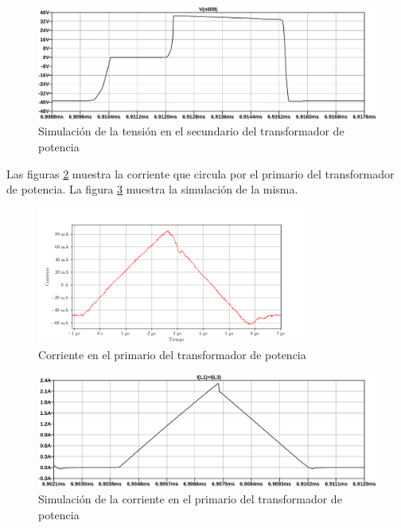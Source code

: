 \begin{figure}[H]
    \centering
    \includegraphics[width=\textwidth]{images/sim/20.pdf}
    \caption{Simulación de la tensión en el secundario del transformador de potencia}
    \label{fig:sim:20}
\end{figure}


Las figuras \ref{fig:osc:24} muestra la corriente que circula por el primario del transformador de potencia. La figura \ref{fig:sim:12} muestra la simulación de la misma.

\begin{figure}[H]
    \centering
    \includegraphics[width=0.8\textwidth]{images/capturas-osciloscopio/17-11-2022/24.png}
    \caption{Corriente en el primario del transformador de potencia}
    \label{fig:osc:24}
\end{figure}

\begin{figure}[H]
    \centering
    \includegraphics[width=\textwidth]{images/sim/12.pdf}
    \caption{Simulación de la corriente en el primario del transformador de potencia}
    \label{fig:sim:12}
\end{figure}

